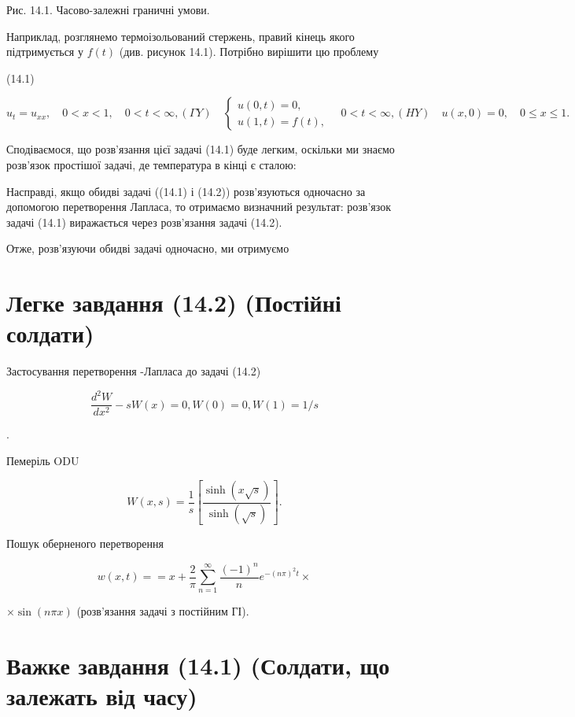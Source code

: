 \documentclass[
  ukrainian,
]{article}
\begin{document}
Рис. 14.1. Часово-залежні граничні умови.

Наприклад, розглянемо термоізольований стержень, правий кінець якого
підтримується у \(f(t)\) (див. рисунок 14.1). Потрібно вирішити цю
проблему

(14.1)

\[
u_{t} = u_{xx}, \quad 0 < x < 1, \quad 0 < t < \infty,
(\Gamma Y) \quad \begin{cases} u(0, t) = 0, \\ u(1, t) = f(t), \end{cases} \quad 0 < t < \infty,
(HY) \quad u(x, 0) = 0, \quad 0 \le x \le 1.
\]

Сподіваємося, що розв'язання цієї задачі (14.1) буде легким, оскільки ми
знаємо розв'язок простішої задачі, де температура в кінці є сталою:

Насправді, якщо обидві задачі ((14.1) і (14.2)) розв'язуються одночасно
за допомогою перетворення Лапласа, то отримаємо визначний результат:
розв'язок задачі (14.1) виражається через розв'язання задачі (14.2).

Отже, розв'язуючи обидві задачі одночасно, ми отримуємо

\section{Легке завдання (14.2) (Постійні
солдати)}\label{ux43bux435ux433ux43aux435-ux437ux430ux432ux434ux430ux43dux43dux44f-14.2-ux43fux43eux441ux442ux456ux439ux43dux456-ux441ux43eux43bux434ux430ux442ux438}

Застосування перетворення -Лапласа до задачі (14.2)

\[
\frac{d^2W}{dx^2} - sW(x) = 0,
W(0) = 0,
W(1) = 1/s
\]

.

Пемеріль ODU

\[
W(x, s) = \frac{1}{s} \left[ \frac{\sinh(x \sqrt{s})}{\sinh(\sqrt{s})} \right].
\]

Пошук оберненого перетворення

\[
w(x, t) =
= x + \frac{2}{\pi} \sum_{n=1}^{\infty} \frac{(-1)^n}{n} e^{-(n\pi)^2 t} \times
\]

\(\times \sin(n\pi x)\) (розв'язання задачі з постійним ГІ).

\section{Важке завдання (14.1) (Солдати, що залежать від
часу)}\label{ux432ux430ux436ux43aux435-ux437ux430ux432ux434ux430ux43dux43dux44f-14.1-ux441ux43eux43bux434ux430ux442ux438-ux449ux43e-ux437ux430ux43bux435ux436ux430ux442ux44c-ux432ux456ux434-ux447ux430ux441ux443}
\end{document}

